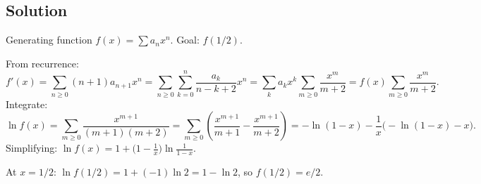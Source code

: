 \documentclass{article}
\begin{document}
\subsection*{Solution}
Generating function $f(x) = \sum a_n x^n$. Goal: $f(1/2)$.

From recurrence:
\[
f'(x) = \sum_{n \ge 0} (n + 1) a_{n+1} x^n = \sum_{n \ge 0} \sum_{k=0}^n \frac{a_k}{n - k + 2} x^n = \sum_k a_k x^k \sum_{m \ge 0} \frac{x^m}{m + 2} = f(x) \sum_{m \ge 0} \frac{x^m}{m + 2}.
\]
Integrate:
\[
\ln f(x) = \sum_{m \ge 0} \frac{x^{m+1}}{(m+1)(m+2)} = \sum_{m \ge 0} \left(\frac{x^{m+1}}{m+1} - \frac{x^{m+1}}{m+2}\right) = -\ln(1 - x) - \frac{1}{x}\bigl(-\ln(1 - x) - x\bigr).
\]
Simplifying: $\ln f(x) = 1 + \bigl(1 - \tfrac{1}{x}\bigr) \ln \tfrac{1}{1 - x}$.

At $x = 1/2$: $\ln f(1/2) = 1 + (-1) \ln 2 = 1 - \ln 2$, so $f(1/2) = e/2$.
\end{document}
